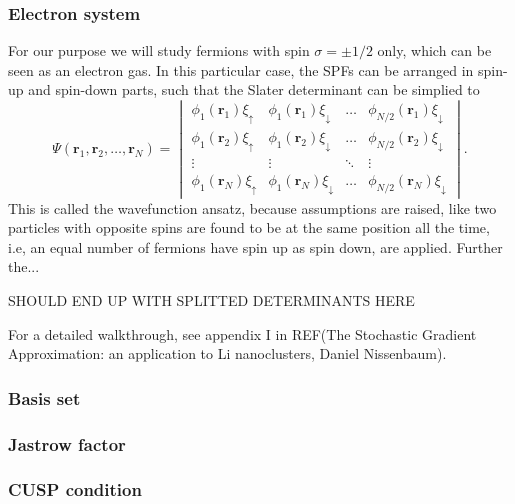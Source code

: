 \subsubsection{Electron system} \label{subsubsec:electronsystem}
For our purpose we will study fermions with spin $\sigma=\pm 1/2$ only, which can be seen as an electron gas. In this particular case, the SPFs can be arranged in spin-up and spin-down parts, such that the Slater determinant can be simplied to 
\begin{equation}
\Psi(\boldsymbol{r}_1,\boldsymbol{r}_2,\hdots,\boldsymbol{r}_N)=
\begin{vmatrix}
\phi_1(\boldsymbol{r}_1)\xi_{\uparrow} & \phi_1(\boldsymbol{r}_1)\xi_{\downarrow} & \hdots & \phi_{N/2}(\boldsymbol{r}_1)\xi_{\downarrow}\\
\phi_1(\boldsymbol{r}_2)\xi_{\uparrow} & \phi_1(\boldsymbol{r}_2)\xi_{\downarrow} & \hdots & \phi_{N/2}(\boldsymbol{r}_2)\xi_{\downarrow}\\
\vdots & \vdots & \ddots & \vdots \\
\phi_1(\boldsymbol{r}_N)\xi_{\uparrow} & \phi_1(\boldsymbol{r}_N)\xi_{\downarrow} & \hdots & \phi_{N/2}(\boldsymbol{r}_N)\xi_{\downarrow}
\end{vmatrix}.
\end{equation}
This is called the wavefunction ansatz, because assumptions are raised, like two particles with opposite spins are found to be at the same position all the time, i.e, an equal number of fermions have spin up as spin down, are applied. Further the...

SHOULD END UP WITH SPLITTED DETERMINANTS HERE

For a detailed walkthrough, see appendix I in REF(The Stochastic Gradient Approximation: an application to Li nanoclusters, Daniel Nissenbaum). 

\subsubsection{Basis set} \label{subsubsec:basisset}

\subsubsection{Jastrow factor} \label{subsubsec:jastrow}

\subsubsection{CUSP condition} \label{subsubsec:cusp}

